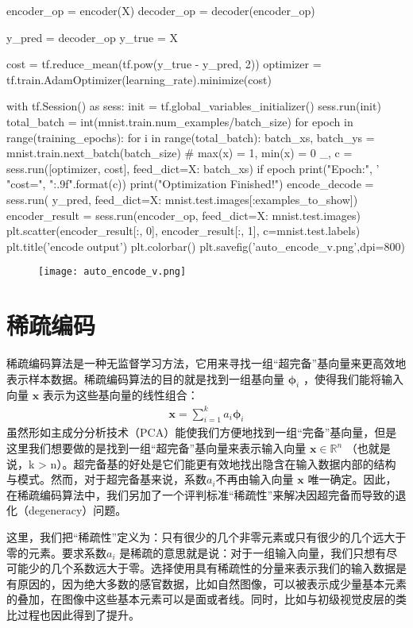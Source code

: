 \begin{python}
encoder_op = encoder(X)
decoder_op = decoder(encoder_op)

y_pred = decoder_op
y_true = X

cost = tf.reduce_mean(tf.pow(y_true - y_pred, 2))
optimizer = tf.train.AdamOptimizer(learning_rate).minimize(cost)


with tf.Session() as sess:
    init = tf.global_variables_initializer()
    sess.run(init)
    total_batch = int(mnist.train.num_examples/batch_size)
    for epoch in range(training_epochs):
        for i in range(total_batch):
            batch_xs, batch_ys = mnist.train.next_batch(batch_size)  # max(x) = 1, min(x) = 0
            _, c = sess.run([optimizer, cost], feed_dict={X: batch_xs})
        if epoch %
            print("Epoch:", '%
                  "cost=", "{:.9f}".format(c))
    print("Optimization Finished!")
    encode_decode = sess.run(
        y_pred, feed_dict={X: mnist.test.images[:examples_to_show]})
    encoder_result = sess.run(encoder_op, feed_dict={X: mnist.test.images})
    plt.scatter(encoder_result[:, 0], encoder_result[:, 1], c=mnist.test.labels)
    plt.title('encode output')
    plt.colorbar()
    plt.savefig('auto_encode_v.png',dpi=800)
\end{python}

\begin{center}
\begin{figure}[H]
\texttt{[image: auto\_encode\_v.png]}
\end{figure}
\end{center}
\section{稀疏编码}
稀疏编码算法是一种无监督学习方法，它用来寻找一组“超完备”基向量来更高效地表示样本数据。稀疏编码算法的目的就是找到一组基向量 $\mathbf{\phi}_i$ ，使得我们能将输入向量 $\mathbf{x}$ 表示为这些基向量的线性组合：
\begin{align}
\mathbf{x} = \sum_{i=1}^k a_i \mathbf{\phi}_{i} 
\end{align}
虽然形如主成分分析技术（PCA）能使我们方便地找到一组“完备”基向量，但是这里我们想要做的是找到一组“超完备”基向量来表示输入向量 $\mathbf{x}\in\mathbb{R}^n$ （也就是说，k > n）。超完备基的好处是它们能更有效地找出隐含在输入数据内部的结构与模式。然而，对于超完备基来说，系数$a_i$不再由输入向量 $\mathbf{x}$ 唯一确定。因此，在稀疏编码算法中，我们另加了一个评判标准“稀疏性”来解决因超完备而导致的退化（degeneracy）问题。

这里，我们把“稀疏性”定义为：只有很少的几个非零元素或只有很少的几个远大于零的元素。要求系数$a_i$ 是稀疏的意思就是说：对于一组输入向量，我们只想有尽可能少的几个系数远大于零。选择使用具有稀疏性的分量来表示我们的输入数据是有原因的，因为绝大多数的感官数据，比如自然图像，可以被表示成少量基本元素的叠加，在图像中这些基本元素可以是面或者线。同时，比如与初级视觉皮层的类比过程也因此得到了提升。

